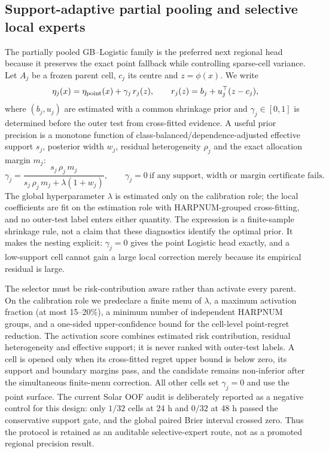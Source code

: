 \documentclass[11pt,a4paper]{article}
\numberwithin{equation}{section}
\theoremstyle{definition}\newtheorem{definition}[theorem]{Definition}
\theoremstyle{remark}\newtheorem{remark}[theorem]{Remark}
\begin{document}
\subsection{Support-adaptive partial pooling and selective local experts}
\label{sec:partial_pooling_local_experts}
The partially pooled GB--Logistic family is the preferred next regional head because it preserves the exact point fallback while controlling sparse-cell variance. Let $A_j$ be a frozen parent cell, $c_j$ its centre and $z=\phi(x)$. We write
\[
 \eta_j(x)=\eta_{\rm point}(x)+\gamma_j\,r_j(z),\qquad
 r_j(z)=b_j+u_j^\top(z-c_j),
\]
where $(b_j,u_j)$ are estimated with a common shrinkage prior and $\gamma_j\in[0,1]$ is determined before the outer test from cross-fitted evidence. A useful prior precision is a monotone function of class-balanced/dependence-adjusted effective support $s_j$, posterior width $w_j$, residual heterogeneity $\rho_j$ and the exact allocation margin $m_j$:
\[
 \gamma_j=\frac{s_j\,\rho_j\,m_j}{s_j\,\rho_j\,m_j+\lambda(1+w_j)},
 \qquad \gamma_j=0\ \text{if any support, width or margin certificate fails}.
\]
The global hyperparameter $\lambda$ is estimated only on the calibration role; the local coefficients are fit on the estimation role with HARPNUM-grouped cross-fitting, and no outer-test label enters either quantity. The expression is a finite-sample shrinkage rule, not a claim that these diagnostics identify the optimal prior. It makes the nesting explicit: $\gamma_j=0$ gives the point Logistic head exactly, and a low-support cell cannot gain a large local correction merely because its empirical residual is large.

The selector must be risk-contribution aware rather than activate every parent. On the calibration role we predeclare a finite menu of $\lambda$, a maximum activation fraction (at most 15--20\%), a minimum number of independent HARPNUM groups, and a one-sided upper-confidence bound for the cell-level point-regret reduction. The activation score combines estimated risk contribution, residual heterogeneity and effective support; it is never ranked with outer-test labels. A cell is opened only when its cross-fitted regret upper bound is below zero, its support and boundary margins pass, and the candidate remains non-inferior after the simultaneous finite-menu correction. All other cells set $\gamma_j=0$ and use the point surface. The current Solar OOF audit is deliberately reported as a negative control for this design: only $1/32$ cells at 24 h and $0/32$ at 48 h passed the conservative support gate, and the global paired Brier interval crossed zero. Thus the protocol is retained as an auditable selective-expert route, not as a promoted regional precision result.
\end{document}
